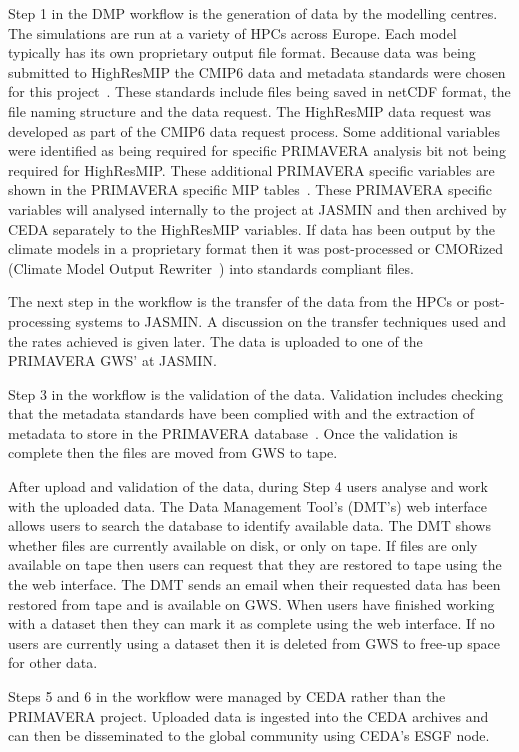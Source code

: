 \documentclass[gmd, manuscript]{copernicus}
\begin{document}
Step 1 in the DMP workflow is the generation of data  by the modelling centres. The simulations are run at a variety of HPCs across Europe. Each model typically has its own proprietary output file format. Because data was being submitted to HighResMIP the CMIP6 data and metadata standards were chosen for this project~\citep{gmd-11-3659-2018}. These standards include files being saved in netCDF format, the file naming structure and the data request. The HighResMIP data request was developed as part of the CMIP6 data request process. Some additional variables were identified as being required for specific PRIMAVERA analysis bit not being required for HighResMIP. These additional PRIMAVERA specific variables are shown in the PRIMAVERA specific MIP tables~\citep{Nadeau2018}. These PRIMAVERA specific variables will analysed internally to the project at JASMIN and then archived by CEDA separately to the HighResMIP variables. If data has been output by the climate models in a proprietary format then it was post-processed or CMORized (Climate Model Output Rewriter~\cite{Nadeau2019}) into standards compliant files.

The next step in the workflow is the transfer of the data from the HPCs or post-processing systems to JASMIN. A discussion on the transfer techniques used and the rates achieved is given later. The data is uploaded to one of the PRIMAVERA GWS' at JASMIN.

Step 3 in the workflow is the validation of the data. Validation includes checking that the metadata standards have been complied with and the extraction of metadata to store in the PRIMAVERA database~\cite{Seddon2020}. Once the validation is complete then the files are moved from GWS to tape.

After upload and validation of the data, during Step 4 users analyse and work with the uploaded data. The Data Management Tool's (DMT's) web interface allows users to search the database to identify available data. The DMT shows whether files are currently available on disk, or only on tape. If files are only available on tape then users can request that they are restored to tape using the the web interface. The DMT sends an email when their requested data has been restored from tape and is available on GWS. When users have finished working with a dataset then they can mark it as complete using the web interface. If no users are currently using a dataset then it is deleted from GWS to free-up space for other data.

Steps 5 and 6 in the workflow were managed by CEDA rather than the PRIMAVERA project. Uploaded data is ingested into the CEDA archives and can then be disseminated to the global community using CEDA's ESGF node.
\end{document}
